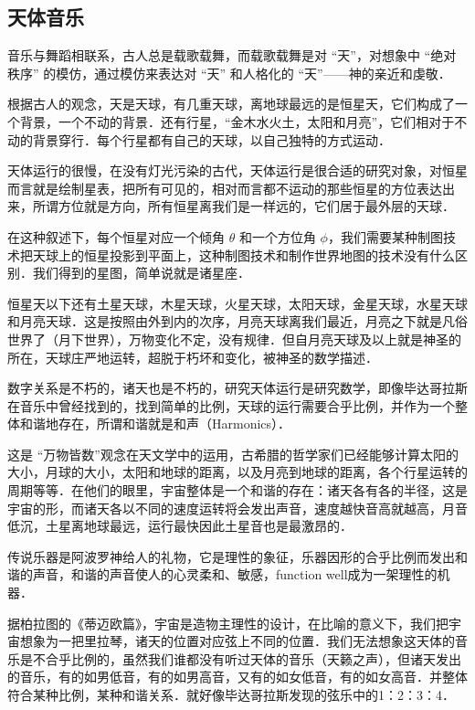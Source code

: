 \subsection{天体音乐}

音乐与舞蹈相联系，古人总是载歌载舞，而载歌载舞是对 “天”，对想象中 “绝对秩序” 的模仿，通过模仿来表达对 “天” 和人格化的 “天”——神的亲近和虔敬．

根据古人的观念，天是天球，有几重天球，离地球最远的是恒星天，它们构成了一个背景，一个不动的背景．还有行星，“金木水火土，太阳和月亮”，它们相对于不动的背景穿行．每个行星都有自己的天球，以自己独特的方式运动．

天体运行的很慢，在没有灯光污染的古代，天体运行是很合适的研究对象，对恒星而言就是绘制星表，把所有可见的，相对而言都不运动的那些恒星的方位表达出来，所谓方位就是方向，所有恒星离我们是一样远的，它们居于最外层的天球．

在这种叙述下，每个恒星对应一个倾角 $\theta $ 和一个方位角 $\phi $，我们需要某种制图技术把天球上的恒星投影到平面上，这种制图技术和制作世界地图的技术没有什么区别．我们得到的星图，简单说就是诸星座．

恒星天以下还有土星天球，木星天球，火星天球，太阳天球，金星天球，水星天球和月亮天球．这是按照由外到内的次序，月亮天球离我们最近，月亮之下就是凡俗世界了（月下世界），万物变化不定，没有规律．但自月亮天球及以上就是神圣的所在，天球庄严地运转，超脱于朽坏和变化，被神圣的数学描述．

数字关系是不朽的，诸天也是不朽的，研究天体运行是研究数学，即像毕达哥拉斯在音乐中曾经找到的，找到简单的比例，天球的运行需要合乎比例，并作为一个整体和谐地存在，所谓和谐就是和声（Harmonics）．

这是 “万物皆数”观念在天文学中的运用，古希腊的哲学家们已经能够计算太阳的大小，月球的大小，太阳和地球的距离，以及月亮到地球的距离，各个行星运转的周期等等．在他们的眼里，宇宙整体是一个和谐的存在：诸天各有各的半径，这是宇宙的形，而诸天各以不同的速度运转将会发出声音，速度越快音高就越高，月音低沉，土星离地球最远，运行最快因此土星音也是最激昂的．

传说乐器是阿波罗神给人的礼物，它是理性的象征，乐器因形的合乎比例而发出和谐的声音，和谐的声音使人的心灵柔和、敏感，function well成为一架理性的机器．

据柏拉图的《蒂迈欧篇》，宇宙是造物主理性的设计，在比喻的意义下，我们把宇宙想象为一把里拉琴，诸天的位置对应弦上不同的位置．我们无法想象这天体的音乐是不合乎比例的，虽然我们谁都没有听过天体的音乐（天籁之声），但诸天发出的音乐，有的如男低音，有的如男高音，又有的如女低音，有的如女高音．并整体符合某种比例，某种和谐关系．就好像毕达哥拉斯发现的弦乐中的1：2：3：4．

